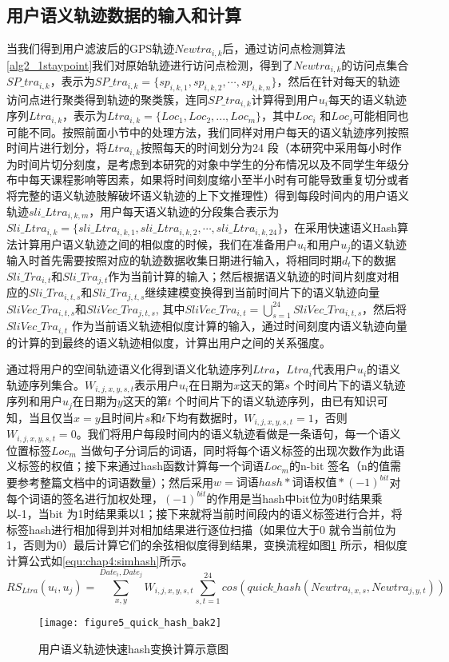 \subsection{用户语义轨迹数据的输入和计算}
当我们得到用户滤波后的GPS轨迹$Newtra_{i,k}$后，通过访问点检测算法\ref{alg2_1staypoint}我们对原始轨迹进行访问点检测，得到了$Newtra_{i,k}$的访问点集合$SP\_tra_{i,k}$，表示为$SP\_tra_{i,k}=\{ sp_{i,k,1},sp_{i,k,2},\cdots , sp_{i,k,n} \}$，然后在针对每天的轨迹访问点进行聚类得到轨迹的聚类簇，连同$SP\_tra_{i,k}$计算得到用户$u_{i}$每天的语义轨迹序列$Ltra_{i,k}$，表示为$ Ltra_{i,k}=\{Loc_{1},Loc_{2},...,Loc_{m}\}$，其中$Loc_{i}$ 和$Loc_{j}$可能相同也可能不同。按照前面小节中的处理方法，我们同样对用户每天的语义轨迹序列按照时间片进行划分，将$ Ltra_{i,k}$按照每天的时间划分为24 段（本研究中采用每小时作为时间片切分刻度，是考虑到本研究的对象中学生的分布情况以及不同学生年级分布中每天课程影响等因素，如果将时间刻度缩小至半小时有可能导致重复切分或者将完整的语义轨迹肢解破坏语义轨迹的上下文推理性）得到每段时间内的用户语义轨迹$sli\_Ltra_{i,k,m}$，用户每天语义轨迹的分段集合表示为$Sli\_Ltra_{i,k}=\{sli\_Ltra_{i,k,1},sli\_Ltra_{i,k,2},\cdots,sli\_Ltra_{i,k,24}\}$，在采用快速语义Hash算法计算用户语义轨迹之间的相似度的时候，我们在准备用户$u_{i}$和用户$u_{j}$的语义轨迹输入时首先需要按照对应的轨迹数据收集日期进行输入，将相同时期$d_{t}$下的数据$Sli\_Tra_{i,t}$和$Sli\_Tra_{j,t}$作为当前计算的输入；然后根据语义轨迹的时间片刻度对相应的$Sli\_Tra_{i,t,s}$和$Sli\_Tra_{j,t,s}$继续建模变换得到当前时间片下的语义轨迹向量$SliVec\_Tra_{i,t,s}$和$SliVec\_Tra_{j,t,s}$, 其中$SliVec\_Tra_{i,t}=\bigcup_{s=1}^{24}SliVec\_Tra_{i,t,s}$，然后将$SliVec\_Tra_{i,t}$ 作为当前语义轨迹相似度计算的输入，通过时间刻度内语义轨迹向量的计算的到最终的语义轨迹相似度，计算出用户之间的关系强度。
\par 通过将用户的空间轨迹语义化得到语义化轨迹序列$Ltra$，$Ltra_{i}$代表用户$u_{i}$的语义轨迹序列集合。$W_{i,j,x,y,s,t}$表示用户$u_{i}$在日期为$x$这天的第$s$ 个时间片下的语义轨迹序列和用户$u_{j}$在日期为$y$这天的第$t$ 个时间片下的语义轨迹序列，由已有知识可知，当且仅当$x=y$且时间片$s$和$t$下均有数据时，$W_{i,j,x,y,s,t}=1$，否则$W_{i,j,x,y,s,t}=0$。我们将用户每段时间内的语义轨迹看做是一条语句，每一个语义位置标签$Loc_{m}$ 当做句子分词后的词语，同时将每个语义标签的出现次数作为此语义标签的权值；接下来通过hash函数计算每一个词语$Loc_{m}$的n-bit 签名（n的值需要参考整篇文档中的词语数量）；然后采用$w=\text{词语}hash*\text{词语权值}*(-1)^{bit}$对每个词语的签名进行加权处理，$(-1)^{bit}$的作用是当hash中bit位为0时结果乘以-1，当bit 为1时结果乘以1；接下来就将当前时间段内的语义标签进行合并，将标签hash进行相加得到并对相加结果进行逐位扫描（如果位大于0 就令当前位为1，否则为0）最后计算它们的余弦相似度得到结果，变换流程如图\ref{fig:quick_hash} 所示，相似度计算公式如\ref{equ:chap4:simhash}所示。
\begin{equation}
\label{equ:chap4:simhash}
RS_{Ltra}(u_{i},u_{j})=\sum_{x ,y }^{ Date_{i}, Date_{j}}W_{i,j,x,y,s,t}\sum_{s,t=1}^{24} cos(quick\_hash(Newtra_{i,x,s},Newtra_{j,y,t}))
\end{equation}
\begin{figure}[htb]
\centering
\texttt{[image: figure5\_quick\_hash\_bak2]}
\caption{用户语义轨迹快速hash变换计算示意图}
\label{fig:quick_hash}
\end{figure}


